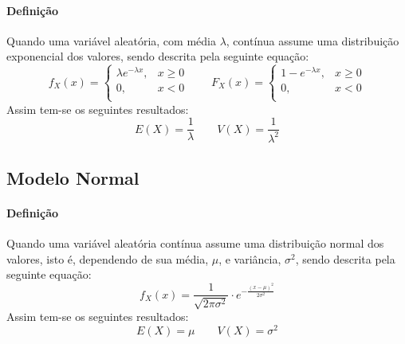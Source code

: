 \documentclass{article}
\begin{document}
            \paragraph{Definição}Quando uma variável aleatória, com média $\lambda$, contínua assume uma distribuição exponencial dos valores, sendo descrita pela seguinte equação:
                \begin{equation}
                    \boxed{
                        f_{X}(x) = 
                        \begin{cases}
                            \lambda e^{-\lambda x}, & x \ge 0\\
                            0,                      & x < 0\\
                        \end{cases}
                    }
                    \qquad
                    \boxed{
                        F_{X}(x) = 
                        \begin{cases}
                            1 - e^{-\lambda x}, & x \ge 0\\
                            0,                  & x < 0\\
                        \end{cases}
                    }
                \end{equation}
            Assim tem-se os seguintes resultados:
                \begin{equation}
                    \boxed{
                        E(X) = \frac{1}{\lambda}
                    }
                    \qquad
                    \boxed{
                        V(X) = \frac{1}{\lambda^2}
                    }
                \end{equation}

        \subsection{Modelo Normal}
            \paragraph{Definição}Quando uma variável aleatória contínua assume uma distribuição normal dos valores, isto é, dependendo de sua média, $\mu$, e variância, $\sigma^{2}$, sendo descrita pela seguinte equação:
                \begin{equation}
                    \boxed{
                        f_{X}(x) = 
                        \frac{1}{\sqrt{2\pi \sigma^{2}}} \cdot 
                        e^{-\frac{(x -\mu)^{2}}{2\sigma^{2}}}
                    }
                \end{equation}
            Assim tem-se os seguintes resultados:
                \begin{equation}
                    \boxed{
                        E(X) = \mu
                    }
                    \qquad
                    \boxed{
                        V(X) = \sigma^{2}
                    }
                \end{equation}
\end{document}
